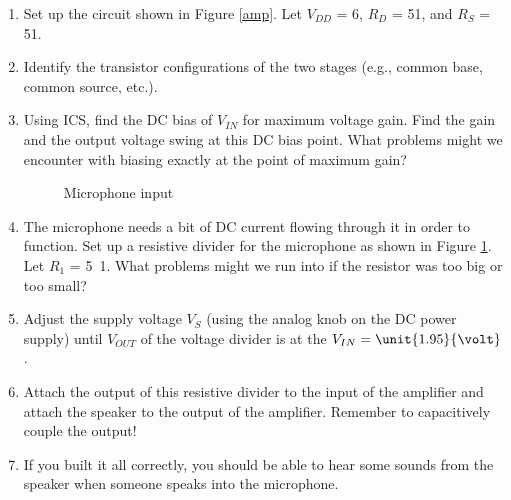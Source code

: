\documentclass{article}
\begin{document}
\begin{enumerate}
	\item Set up the circuit shown in Figure \ref{amp}. Let $V_{DD}$ = \unit{6}{\volt}, $R_D$ = \unit{51}{\kilo\ohm}, and $R_S$ = \unit{51}{\ohm}.
	\item Identify the transistor configurations of the two stages (e.g., common base, common source, etc.).
	\item Using ICS, find the DC bias of $V_{IN}$ for maximum voltage gain. Find the gain and the output voltage swing at this DC bias point. What problems might we encounter with biasing exactly at the point of maximum gain?
		
		\begin{figure}[!htb]
			
			\centerline{\box\graph}
			\caption{Microphone input}
			\label{mic}
		\end{figure}
	
	\item The microphone needs a bit of DC current flowing through it in order to function. Set up a resistive divider for the microphone as shown in Figure \ref{mic}. Let $R_1$ = \unit{5.1}{\kilo\ohm}. What problems might we run into if the resistor was too big or too small?
	\item Adjust the supply voltage $V_S$ (using the analog knob on the DC power supply) until $V_{OUT}$ of the voltage divider is at the $V_{IN} = \unit{1.95}{\volt}$.
	\item Attach the output of this resistive divider to the input of the amplifier and attach the speaker to the output of the amplifier. Remember to capacitively couple the output!
	\item If you built it all correctly, you should be able to hear some sounds from the speaker when someone speaks into the microphone.
\end{enumerate}
\end{document}
